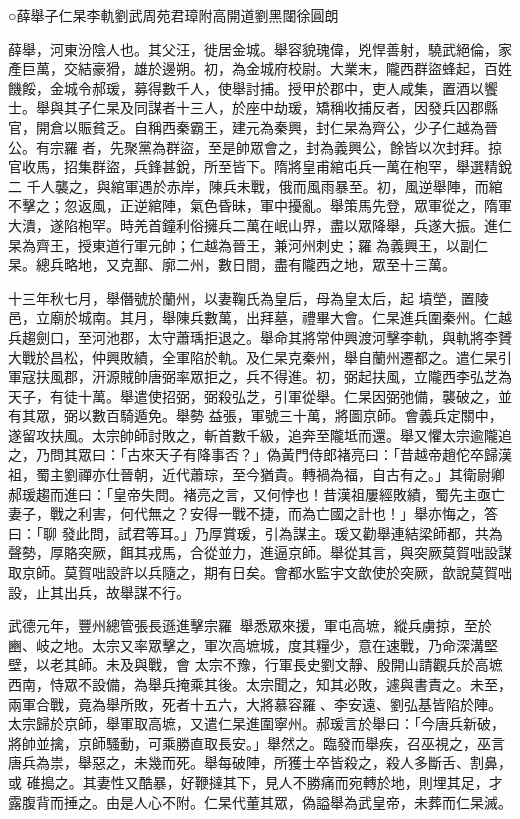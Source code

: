 
\begin{pinyinscope}

 ○薛舉子仁杲李軌劉武周苑君璋附高開道劉黑闥徐圓朗



 薛舉，河東汾陰人也。其父汪，徙居金城。舉容貌瑰偉，兇悍善射，驍武絕倫，家產巨萬，交結豪猾，雄於邊朔。初，為金城府校尉。大業末，隴西群盜蜂起，百姓饑餒，金城令郝瑗，募得數千人，使舉討捕。授甲於郡中，吏人咸集，置酒以饗士。舉與其子仁杲及同謀者十三人，於座中劫瑗，矯稱收捕反者，因發兵囚郡縣官，開倉以賑貧乏。自稱西秦霸王，建元為秦興，封仁杲為齊公，少子仁越為晉公。有宗羅者，先聚黨為群盜，至是帥眾會之，封為義興公，餘皆以次封拜。掠官收馬，招集群盜，兵鋒甚銳，所至皆下。隋將皇甫綰屯兵一萬在枹罕，舉選精銳二
 千人襲之，與綰軍遇於赤岸，陳兵未戰，俄而風雨暴至。初，風逆舉陣，而綰不擊之；忽返風，正逆綰陣，氣色昏昧，軍中擾亂。舉策馬先登，眾軍從之，隋軍大潰，遂陷枹罕。時羌首鐘利俗擁兵二萬在岷山界，盡以眾降舉，兵遂大振。進仁杲為齊王，授東道行軍元帥；仁越為晉王，兼河州刺史；羅為義興王，以副仁杲。總兵略地，又克鄯、廓二州，數日間，盡有隴西之地，眾至十三萬。



 十三年秋七月，舉僭號於蘭州，以妻鞠氏為皇后，母為皇太后，起
 墳塋，置陵邑，立廟於城南。其月，舉陳兵數萬，出拜墓，禮畢大會。仁杲進兵圍秦州。仁越兵趨劍口，至河池郡，太守蕭瑀拒退之。舉命其將常仲興渡河擊李軌，與軌將李贇大戰於昌松，仲興敗績，全軍陷於軌。及仁杲克秦州，舉自蘭州遷都之。遣仁杲引軍寇扶風郡，汧源賊帥唐弼率眾拒之，兵不得進。初，弼起扶風，立隴西李弘芝為天子，有徒十萬。舉遣使招弼，弼殺弘芝，引軍從舉。仁杲因弼弛備，襲破之，並有其眾，弼以數百騎遁免。舉勢
 益張，軍號三十萬，將圖京師。會義兵定關中，遂留攻扶風。太宗帥師討敗之，斬首數千級，追奔至隴坻而還。舉又懼太宗逾隴追之，乃問其眾曰：「古來天子有降事否？」偽黃門侍郎褚亮曰：「昔越帝趙佗卒歸漢祖，蜀主劉禪亦仕晉朝，近代蕭琮，至今猶貴。轉禍為福，自古有之。」其衛尉卿郝瑗趨而進曰：「皇帝失問。褚亮之言，又何悖也！昔漢祖屢經敗績，蜀先主亟亡妻子，戰之利害，何代無之？安得一戰不捷，而為亡國之計也！」舉亦悔之，答曰：「聊
 發此問，試君等耳。」乃厚賞瑗，引為謀主。瑗又勸舉連結梁師都，共為聲勢，厚賂突厥，餌其戎馬，合從並力，進逼京師。舉從其言，與突厥莫賀咄設謀取京師。莫賀咄設許以兵隨之，期有日矣。會都水監宇文歆使於突厥，歆說莫賀咄設，止其出兵，故舉謀不行。



 武德元年，豐州總管張長遜進擊宗羅，舉悉眾來援，軍屯高墌，縱兵虜掠，至於豳、岐之地。太宗又率眾擊之，軍次高墌城，度其糧少，意在速戰，乃命深溝堅壁，以老其師。未及與戰，會
 太宗不豫，行軍長史劉文靜、殷開山請觀兵於高墌西南，恃眾不設備，為舉兵掩乘其後。太宗聞之，知其必敗，遽與書責之。未至，兩軍合戰，竟為舉所敗，死者十五六，大將慕容羅、李安遠、劉弘基皆陷於陣。太宗歸於京師，舉軍取高墌，又遣仁杲進圍寧州。郝瑗言於舉曰：「今唐兵新破，將帥並擒，京師騷動，可乘勝直取長安。」舉然之。臨發而舉疾，召巫視之，巫言唐兵為祟，舉惡之，未幾而死。舉每破陣，所獲士卒皆殺之，殺人多斷舌、割鼻，或
 碓搗之。其妻性又酷暴，好鞭撻其下，見人不勝痛而宛轉於地，則埋其足，才露腹背而捶之。由是人心不附。仁杲代董其眾，偽謚舉為武皇帝，未葬而仁杲滅。




\end{pinyinscope}
